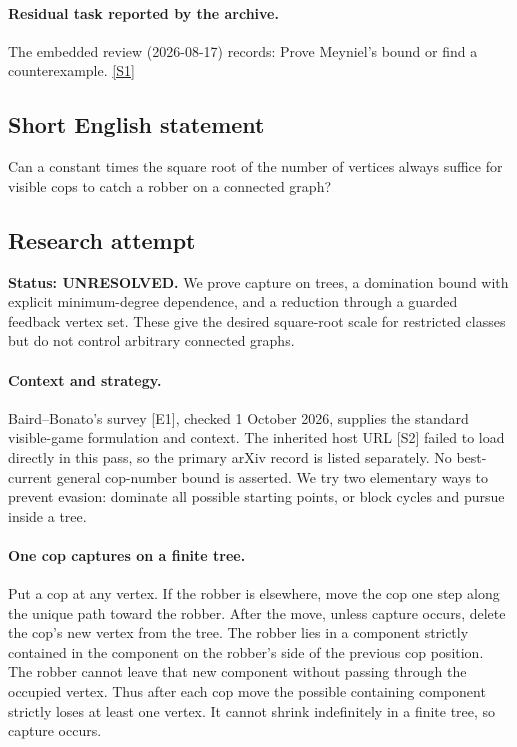 \documentclass[11pt,a4paper]{article}
\newcommand{\sref}[2]{\hyperlink{source:#1:#2}{[S#2]}}
\begin{document}
\paragraph{Residual task reported by the archive.}

The embedded review (2026-08-17) records: Prove Meyniel's bound or find a counterexample. \sref{1391}{1}

\subsection{Short English statement}

Can a constant times the square root of the number of vertices always suffice for visible cops to catch a robber on a connected graph?

\subsection{Research attempt}
\textbf{Status: UNRESOLVED.} We prove capture on trees, a domination bound with explicit minimum-degree dependence, and a reduction through a guarded feedback vertex set. These give the desired square-root scale for restricted classes but do not control arbitrary connected graphs.

\paragraph{Context and strategy.}
Baird--Bonato's survey [E1], checked 1 October 2026, supplies the standard visible-game formulation and context. The inherited host URL [S2] failed to load directly in this pass, so the primary arXiv record is listed separately. No best-current general cop-number bound is asserted. We try two elementary ways to prevent evasion: dominate all possible starting points, or block cycles and pursue inside a tree.

\paragraph{One cop captures on a finite tree.}
Put a cop at any vertex. If the robber is elsewhere, move the cop one step along the unique path toward the robber. After the move, unless capture occurs, delete the cop's new vertex from the tree. The robber lies in a component strictly contained in the component on the robber's side of the previous cop position. The robber cannot leave that new component without passing through the occupied vertex. Thus after each cop move the possible containing component strictly loses at least one vertex. It cannot shrink indefinitely in a finite tree, so capture occurs.
\end{document}
